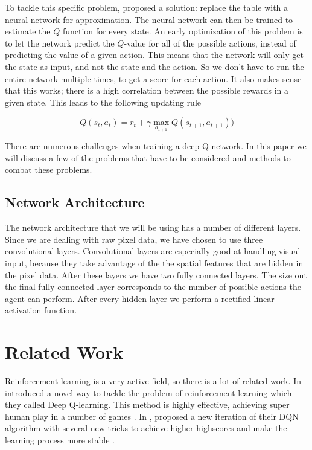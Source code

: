 \documentclass{article}
\begin{document}
To tackle this specific problem, \citeauthor{mnih2013playing} proposed a solution: replace the table with a neural network for approximation. The neural network can then be trained to estimate the $Q$ function for every state. 
An early optimization of this problem is to let the network predict the $Q$-value for all of the possible actions, instead of predicting the value of a given action. This means that the network will only get the state as input, and not the state and the action. So we don't have to run the entire network multiple times, to get a score for each action. It also makes sense that this works; there is a high correlation between the possible rewards in a given state. This leads to the following updating rule

\[
    Q(s_t,a_t) = r_t + \gamma \max_{a_{t+1}} Q(s_{t+1},a_{t+1}))
\]


There are numerous challenges when training a deep Q-network. In this paper we will discuss a few of the problems that have to be considered and methods to combat these problems.

\subsection{Network Architecture}

The network architecture that we will be using has a number of different layers. Since we are dealing with raw pixel data, we have chosen to use three convolutional layers. Convolutional layers are especially good at handling visual input, because they take advantage of the the spatial features that are hidden in the pixel data. After these layers we have two fully connected layers. The size out the final fully connected layer corresponds to the number of possible actions the agent can perform. After every hidden layer we perform a rectified linear activation function.



\section{Related Work}

Reinforcement learning is a very active field, so there is a lot of related work. In \citeyear{mnih2013playing} \citeauthor{mnih2013playing} introduced a novel way to tackle the problem of reinforcement learning which they called Deep Q-learning. This method is highly effective, achieving super human play in a number of games \cite{mnih2013playing}. In \citeyear{mnih2015human}, \citeauthor{mnih2013playing} proposed a new iteration of their DQN algorithm with several new tricks to achieve higher highscores and make the learning process more stable \cite{mnih2015human}.
\end{document}
